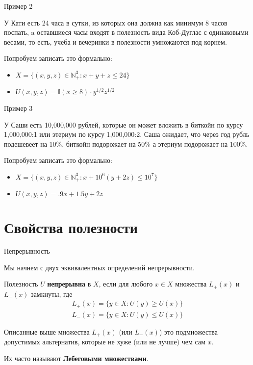 \documentclass{beamer}
\begin{document}
\begin{frame}{Пример 2}

У Кати есть 24 часа в сутки, из которых она должна как минимум 8 часов поспать, a оставшиеся часы входят в полезность вида Коб-Дуглас с одинаковыми весами, то есть, учеба и вечеринки в полезности умножаются под корнем.

Попробуем записать это формально:

\begin{itemize}
  \item $X = \{(x, y, z) \in  \mathbb{N}^3_{+}: x + y + z \leqslant 24 \}$
  \item $U(x, y, z) = \mathbb{I}(x \geqslant 8)\cdot y^{1/2}z^{1/2}$
\end{itemize}

\end{frame}

\begin{frame}{Пример 3}

У Саши есть 10,000,000 рублей, которые он может вложить в биткойн по курсу 1,000,000:1 или этериум по курсу 1,000,000:2. Саша ожидает, что через год рубль подешевеет на 10\%, биткойн подорожает на 50\% а этериум подорожает на 100\%.

Попробуем записать это формально:

\begin{itemize}
  \item $X = \{(x, y, z) \in  \mathbb{N}^3_{+}: x + 10^6 (y + 2 z) \leqslant 10^7 \}$
  \item $U(x, y, z) = .9 x + 1.5 y + 2 z$
\end{itemize}

\end{frame}

\section{Свойства полезности}

\begin{frame}{Непрерывность}

Мы начнем с двух эквивалентных определений непрерывности.

\begin{definition}
Полезность $U$ \textbf{непрерывна} в $X$, если для любого $x \in X$ множества $L_{+}(x)$ и $L_{-}(x)$ замкнуты, где
\begin{gather*} L_{+}(x) = \{y \in X: U(y) \geqslant U(x)\}\\
 L_{-}(x) = \{y \in X: U(y) \leqslant U(x)\}\end{gather*}
\end{definition}

Описанные выше множества $L_{+}(x)$ (или $L_{-}(x)$) это подмножества допустимых альтернатив, которые не хуже (или не лучше) чем сам $x$. 

Их часто называют \textbf{Лебеговыми множествами}.

\end{frame}
\end{document}
